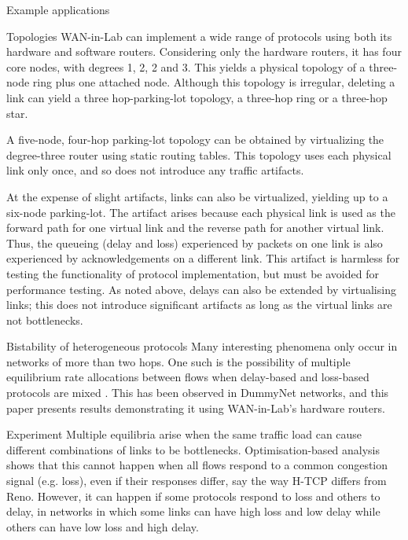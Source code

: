 \documentclass{IEEEtran}
\begin{document}
\begin{section}{Example applications}
\begin{subsection}{Topologies}
WAN-in-Lab can implement a wide range of protocols using both its hardware
and software routers.  Considering only the hardware routers, it has four
core nodes, with degrees 1, 2, 2 and 3.  This yields a physical topology
of a three-node ring plus one attached node.  Although this topology is
irregular, deleting a link can yield a three hop-parking-lot topology,
a three-hop ring or a three-hop star.

A five-node, four-hop parking-lot topology can be obtained by virtualizing
the degree-three router using static routing tables.  This topology
uses each physical link only once, and so does not introduce any traffic
artifacts.

At the expense of slight artifacts, links can also be virtualized,
yielding up to a six-node parking-lot.  The artifact arises because
each physical link is used as the forward path for one virtual link
and the reverse path for another virtual link.  Thus, the queueing
(delay and loss) experienced by packets on one link is also experienced
by acknowledgements on a different link.  This artifact is harmless for
testing the functionality of protocol implementation, but must be avoided
for performance testing.  As noted above, delays can also be extended
by virtualising links; this does not introduce significant artifacts as
long as the virtual links are not bottlenecks.
\end{subsection}

\begin{subsection}{Bistability of heterogeneous protocols}
Many interesting phenomena only occur in networks of more than two hops.
One such is the possibility of multiple equilibrium rate allocations
between flows when delay-based and loss-based protocols are mixed
\cite{Heterogeneous}.  This has been observed in DummyNet networks,
and this paper presents results demonstrating it using WAN-in-Lab's hardware
routers.

\begin{subsubsection}{Experiment}
Multiple equilibria arise when the same traffic load can cause different
combinations of links to be bottlenecks.  Optimisation-based
analysis~\cite{Duality-model} shows that this cannot happen when all flows
respond to a common congestion signal (e.g. loss), even if their responses
differ, say the way H-TCP differs from Reno.  However, it can happen if
some protocols respond to loss and others to delay, in networks in which
some links can have high loss and low delay while others can have low loss and
high delay.


\end{subsubsection}
\end{subsection}
\end{section}
\end{document}
